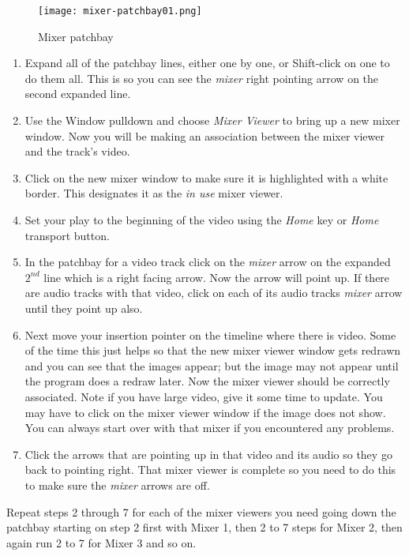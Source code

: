 \begin{figure}[htpb]
	\centering
	\texttt{[image: mixer-patchbay01.png]}
	\caption{Mixer  patchbay}
	\label{fig:mixer-patchbay01}
\end{figure}

\begin{enumerate}
	\item Expand all of the patchbay lines, either one by one, or Shift-click on one to do them all. This is so you can see the \textit{mixer} right pointing arrow on the second expanded line.    
	\item Use the Window pulldown and choose \textit{Mixer Viewer} to bring up a new mixer window.  Now you will be making an association between the mixer viewer and the track’s video.
	\item Click on the new mixer window to make sure it is highlighted with a white border. This designates it as the \textit{in use} mixer viewer.
	\item Set your play to the beginning of the video using the \textit{Home} key or \textit{Home} transport button.
	\item In the patchbay for a video track click on the \textit{mixer} arrow on the expanded $2^{nd}$ line which is a right facing arrow.  Now the arrow will point up.  If there are audio tracks with that video, click on each of its audio tracks \textit{mixer} arrow until they point up also.
	\item Next move your insertion pointer on the timeline where there is video.  Some of the time this just helps so that the new mixer viewer window gets redrawn and you can see that the images appear; but the image may not appear until the program does a redraw later.  Now the mixer viewer should be
	correctly associated.  Note if you have large video, give it some time to update.  You may have to click on the mixer viewer window if the image does not show.  You can always start over with that mixer if you encountered any problems.
	\item Click the arrows that are pointing up in that video and its audio so they go back to pointing right. That mixer viewer is complete so you need to do this to make sure the \textit{mixer} arrows are off.
\end{enumerate}

Repeat steps 2 through 7 for each of the mixer viewers you need going down the patchbay starting on step 2 first with Mixer 1, then 2 to 7 steps for Mixer 2, then again run 2 to 7 for Mixer 3 and so on.

